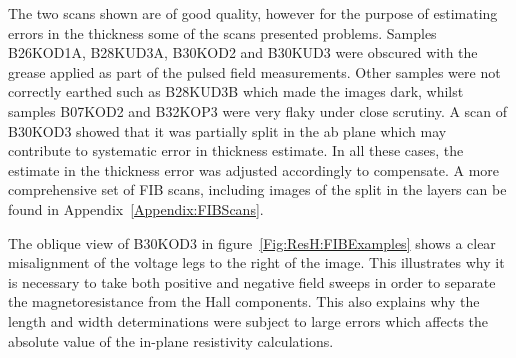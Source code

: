 The two scans shown are of good quality, however for the purpose of estimating errors in the thickness some of the scans presented problems. Samples B26KOD1A, B28KUD3A, B30KOD2 and B30KUD3 were obscured with the grease applied as part of the pulsed field measurements. Other samples were not correctly earthed such as B28KUD3B which made the images dark, whilst samples B07KOD2 and B32KOP3 were very flaky under close scrutiny. A scan of B30KOD3 showed that it was partially split in the ab plane which may contribute to systematic error in thickness estimate. In all these cases, the estimate in the thickness error was adjusted accordingly to compensate. A more comprehensive set of \ac{FIB} scans, including images of the split in the layers can be found in Appendix~\ref{Appendix:FIBScans}.

The oblique view of B30KOD3 in figure~\ref{Fig:ResH:FIBExamples} shows a clear misalignment of the voltage legs to the right of the image. This illustrates why it is necessary to take both positive and negative field sweeps in order to separate the magnetoresistance from the Hall components. This also explains why the length and width determinations were subject to large errors which affects the absolute value of the in-plane resistivity calculations.

